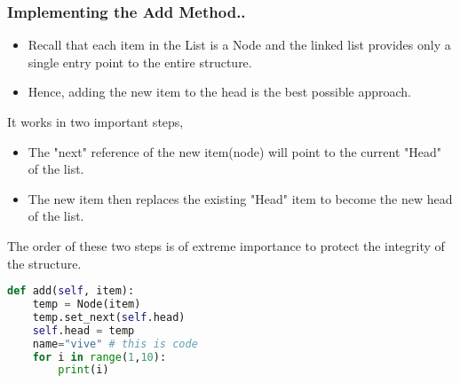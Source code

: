 \documentclass{beamer}
\begin{document}
\begin{frame}
\frametitle{Implementing the Add Method..}
\begin{itemize}
\item Recall that each item in the List is a Node and the linked list provides only a single entry point to the entire structure.

\item Hence, adding the new item to the head is the best possible approach.

\end{itemize}
It works in two important steps,
\begin{itemize}

\item The "next" reference of the new item(node) will point to the current "Head" of the list.

\item The new item then replaces the existing "Head" item to become the new head of the list.

\end{itemize}

The order of these two steps is of extreme importance to protect the integrity of the structure. 
 
\end{frame}

\begin{frame}[fragile]

\begin{lstlisting}[language=Python, keywordstyle=\color{blue}]
def add(self, item):
	temp = Node(item)
	temp.set_next(self.head)
	self.head = temp
	name="vive" # this is code
	for i in range(1,10):
		print(i)
\end{lstlisting}
\end{frame}
\end{document}

